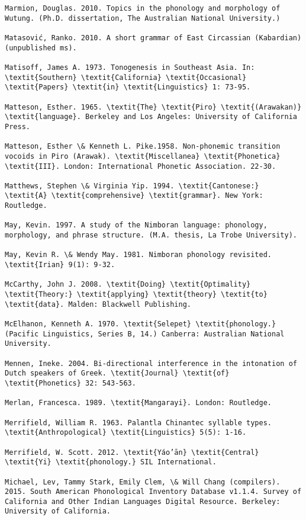 \begin{verbatim}
Marmion, Douglas. 2010. Topics in the phonology and morphology of Wutung. (Ph.D. dissertation, The Australian National University.)

Matasović, Ranko. 2010. A short grammar of East Circassian (Kabardian) (unpublished ms).

Matisoff, James A. 1973. Tonogenesis in Southeast Asia. In: \textit{Southern} \textit{California} \textit{Occasional} \textit{Papers} \textit{in} \textit{Linguistics} 1: 73-95.

Matteson, Esther. 1965. \textit{The} \textit{Piro} \textit{(Arawakan)} \textit{language}. Berkeley and Los Angeles: University of California Press.

Matteson, Esther \& Kenneth L. Pike.1958. Non-phonemic transition vocoids in Piro (Arawak). \textit{Miscellanea} \textit{Phonetica} \textit{III}. London: International Phonetic Association. 22-30.

Matthews, Stephen \& Virginia Yip. 1994. \textit{Cantonese:} \textit{A} \textit{comprehensive} \textit{grammar}. New York: Routledge.

May, Kevin. 1997. A study of the Nimboran language: phonology, morphology, and phrase structure. (M.A. thesis, La Trobe University).

May, Kevin R. \& Wendy May. 1981. Nimboran phonology revisited. \textit{Irian} 9(1): 9-32.

McCarthy, John J. 2008. \textit{Doing} \textit{Optimality} \textit{Theory:} \textit{applying} \textit{theory} \textit{to} \textit{data}. Malden: Blackwell Publishing.

McElhanon, Kenneth A. 1970. \textit{Selepet} \textit{phonology.} (Pacific Linguistics, Series B, 14.) Canberra: Australian National University.

Mennen, Ineke. 2004. Bi-directional interference in the intonation of Dutch speakers of Greek. \textit{Journal} \textit{of} \textit{Phonetics} 32: 543-563.

Merlan, Francesca. 1989. \textit{Mangarayi}. London: Routledge.

Merrifield, William R. 1963. Palantla Chinantec syllable types. \textit{Anthropological} \textit{Linguistics} 5(5): 1-16.

Merrifield, W. Scott. 2012. \textit{Yáo’ān} \textit{Central} \textit{Yi} \textit{phonology.} SIL International.

Michael, Lev, Tammy Stark, Emily Clem, \& Will Chang (compilers). 2015. South American Phonological Inventory Database v1.1.4. Survey of California and Other Indian Languages Digital Resource. Berkeley: University of California.


\end{verbatim}
